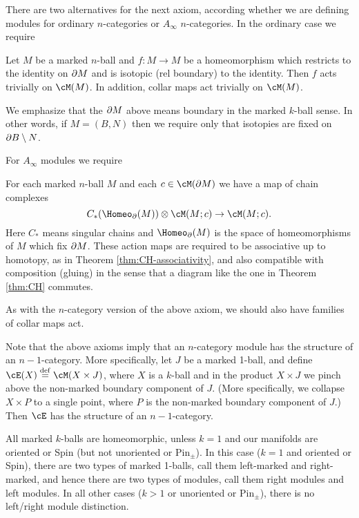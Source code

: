 \medskip

There are two alternatives for the next axiom, according whether we are defining
modules for ordinary $n$-categories or $A_\infty$ $n$-categories.
In the ordinary case we require

\begin{module-axiom}
{Let $M$ be a marked $n$-ball and $f: M\to M$ be a homeomorphism which restricts
to the identity on $\partial M$ and is isotopic (rel boundary) to the identity.
Then $f$ acts trivially on $\cM(M)$.}
In addition, collar maps act trivially on $\cM(M)$.
\end{module-axiom}

We emphasize that the $\partial M$ above means boundary in the marked $k$-ball sense.
In other words, if $M = (B, N)$ then we require only that isotopies are fixed 
on $\partial B \setminus N$.

For $A_\infty$ modules we require

\begin{module-axiom}
For each marked $n$-ball $M$ and each $c\in \cM(\bd M)$ we have a map of chain complexes
\[
	C_*(\Homeo_\bd(M))\ot \cM(M; c) \to \cM(M; c) .
\]
Here $C_*$ means singular chains and $\Homeo_\bd(M)$ is the space of homeomorphisms of $M$
which fix $\partial M$.
These action maps are required to be associative up to homotopy, as in Theorem \ref{thm:CH-associativity}, 
and also compatible with composition (gluing) in the sense that
a diagram like the one in Theorem \ref{thm:CH} commutes.
\end{module-axiom}

As with the $n$-category version of the above axiom, we should also have families of collar maps act.

\medskip

Note that the above axioms imply that an $n$-category module has the structure
of an $n{-}1$-category.
More specifically, let $J$ be a marked 1-ball, and define $\cE(X)\deq \cM(X\times J)$,
where $X$ is a $k$-ball and in the product $X\times J$ we pinch 
above the non-marked boundary component of $J$.
(More specifically, we collapse $X\times P$ to a single point, where
$P$ is the non-marked boundary component of $J$.)
Then $\cE$ has the structure of an $n{-}1$-category.

All marked $k$-balls are homeomorphic, unless $k = 1$ and our manifolds
are oriented or Spin (but not unoriented or $\text{Pin}_\pm$).
In this case ($k=1$ and oriented or Spin), there are two types
of marked 1-balls, call them left-marked and right-marked,
and hence there are two types of modules, call them right modules and left modules.
In all other cases ($k>1$ or unoriented or $\text{Pin}_\pm$),
there is no left/right module distinction.


